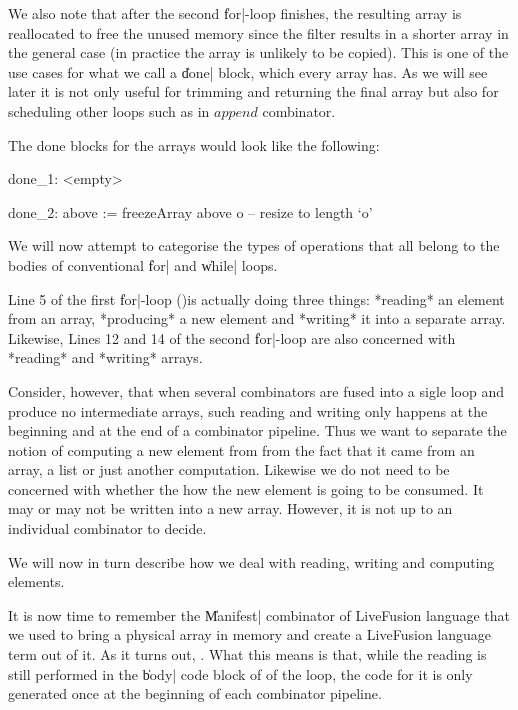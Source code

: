 \documentclass[preamble.tex]{subfiles}
\begin{document}
We also note that after the second \|for|-loop finishes, the resulting array is reallocated to free the unused memory since the filter results in a shorter array in the general case (in practice the array is unlikely to be copied). This is one of the use cases for what we call a \|done| block, which every array has. As we will see later it is not only useful for trimming and returning the final array but also for scheduling other loops such as in $append$ combinator.

The done blocks for the arrays would look like the following:

\begin{loopcode}
  done_1:
    <empty>

  done_2:
    above := freezeArray above o  -- resize to length `o'
\end{loopcode}

We will now attempt to categorise the types of operations that all belong to the bodies of conventional \|for| and \|while| loops.

Line 5 of the first \|for|-loop ()is actually doing three things: *reading* an element from an array, *producing* a new element and *writing* it into a separate array. Likewise, Lines 12 and 14 of the second \|for|-loop are also concerned with *reading* and *writing* arrays.

Consider, however, that when several combinators are fused into a sigle loop and produce no intermediate arrays, such reading and writing only happens at the beginning and at the end of a combinator pipeline. Thus we want to separate the notion of computing a new element from from the fact that it came from an array, a list or just another computation. Likewise we do not need to be concerned with whether the how the new element is going to be consumed. It may or may not be written into a new array. However, it is not up to an individual combinator to decide.

We will now in turn describe how we deal with reading, writing and computing elements.

It is now time to remember the \|Manifest| combinator of LiveFusion language that we used to bring a physical array in memory and create a LiveFusion language term out of it. As it turns out, . What this means is that, while the reading is still performed in the \|body| code block of of the loop, the code for it is only generated once at the beginning of each combinator pipeline.
\end{document}
